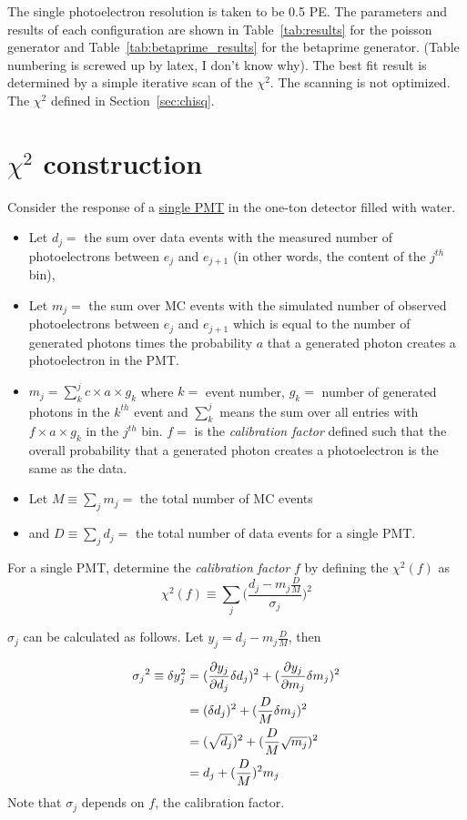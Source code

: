 \documentclass[12pt]{article}
\begin{document}
The single photoelectron resolution is taken to be 0.5 PE.
The parameters and results of each configuration are shown in Table~\ref{tab:results}  for the poisson generator and 
Table~\ref{tab:betaprime_results} for the betaprime generator. (Table numbering is screwed up by latex, I don't know why). 
The best fit result is determined by a simple iterative scan of the $\chi^2$. The scanning is not optimized. 
The $\chi^2$ defined in Section~\ref{sec:chisq}.

\section{$\chi^2$ construction \label{sec:chisq}}
Consider the response of a \underline{single PMT} in the one-ton detector filled with water.
  \begin{itemize}
	\item Let $d_j = $ the sum over data events with the measured number of photoelectrons between $e_j$ and 	
	$e_{j+1}$ (in other words, the content of the $j^{th}$ bin),
	\item Let $m_j = $ the sum over MC events with the simulated number of observed photoelectrons 
	between $e_j$ and $e_{j+1}$ which is equal to the number of generated photons times the probability $a$ that
	a generated photon creates a photoelectron in the PMT.
	\item $m_j  = \sum_k^j c\times a\times g_k$ 
	where $k=$ event number, 
	$g_k = $ number of generated photons in the $k^{th}$ event and 
	$\sum_k^j$ means the sum over all entries with 
	$f\times a\times g_k$ in the $j^{th}$ bin. 
	$f=$ is the {\em calibration factor} defined such that the overall probability that a generated photon creates a photoelectron is the same as the data. 
	\item Let $M \equiv \sum_j m_j = $ the total number of MC events 
	\item and $D \equiv \sum_j d_j = $ the total number of data events for a single PMT.
	
\end{itemize}
For a single PMT, determine the {\em calibration factor} $f$ by defining the $\chi^2(f)$ as
\begin{equation}\label{eqn:chisq}
	\chi^2(f) \equiv \sum_j \bigl( \frac{d_j - m_j \frac{D}{M}}{\sigma_j} \bigr)^2
\end{equation}

$\sigma_j$ can be calculated as follows. Let $y_j = d_j - m_j\frac{D}{M}$, then

\begin{eqnarray}
\sigma_{\color{black}j}^{\color{black}2} \equiv \delta y_j^2 &= (\frac{\partial y_j}{\partial d_j} \delta d_j)^2 + (\frac{\partial y_j}{\partial m_j} \delta m_j)^2  \\
                    &=(\delta d_j)^2 + (\frac{D}{M} \delta m_j)^2 \\
                    &=(\sqrt{d_j})^2 + (\frac{D}{M} \sqrt{m_j})^2 \\
                    &= d_j + (\frac{D}{M})^2 m_j
\end{eqnarray}
Note that $\sigma_j$ depends on $f$, the calibration factor. 
\end{document}
